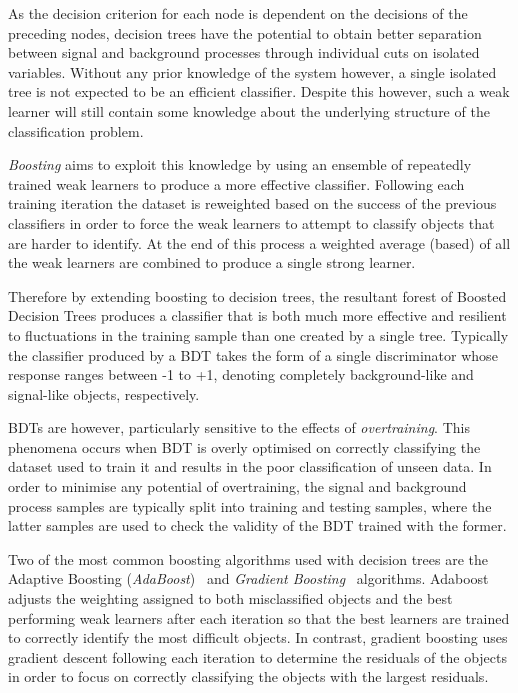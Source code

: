 As the decision criterion for each node is dependent on the decisions of the preceding nodes, decision trees have the potential to obtain better separation between signal and background processes through individual cuts on isolated variables.
Without any prior knowledge of the system however, a single isolated tree is not expected to be an efficient classifier.
Despite this however, such a weak learner will still contain some knowledge about the underlying structure of the classification problem.

\emph{Boosting} aims to exploit this knowledge by using an ensemble of repeatedly trained weak learners to produce a more effective classifier.
Following each training iteration the dataset is reweighted based on the success of the previous classifiers in order to force the weak learners to attempt to classify objects that are harder to identify.
At the end of this process a weighted average (based) of all the weak learners are combined to produce a single strong learner.

Therefore by extending boosting to decision trees, the resultant forest of Boosted Decision Trees produces a classifier that is both much more effective and resilient to fluctuations in the training sample than one created by a single tree.
Typically the classifier produced by a BDT takes the form of a single discriminator whose response ranges between -1 to +1, denoting completely background-like and signal-like objects, respectively.

BDTs are however, particularly sensitive to the effects of \emph{overtraining}.
This phenomena occurs when BDT is overly optimised on correctly classifying the dataset used to train it and results in the poor classification of unseen data.
In order to minimise any potential of overtraining, the signal and background process samples are typically split into training and testing samples, where the latter samples are used to check the validity of the BDT trained with the former.

Two of the most common boosting algorithms used with decision trees are the Adaptive Boosting (\emph{AdaBoost})~\cite{Friedman:additivelogistic} and \emph{Gradient Boosting}~\cite{Friedman:greedyfunction,Friedman:GradientBoosting} algorithms.
Adaboost adjusts the weighting assigned to both  misclassified objects and the best performing weak learners after each iteration so that the best learners are trained to correctly identify the most difficult objects.
In contrast, gradient boosting uses gradient descent following each iteration to determine the residuals of the objects in order to focus on correctly classifying the objects with the largest residuals.

